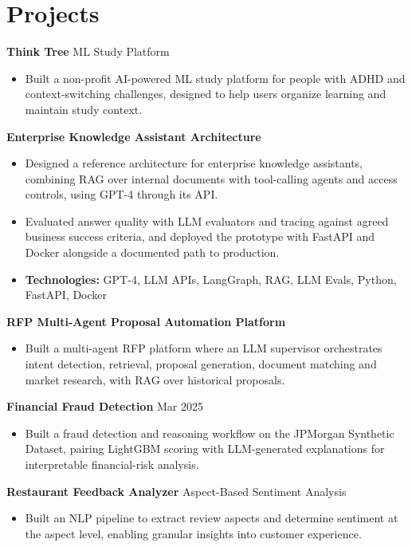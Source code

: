 \documentclass[10pt,a4paper]{article}
\begin{document}
\section{Projects}
\textbf{Think Tree} \textbar{} ML Study Platform\par
\begin{itemize}
  \item Built a non-profit AI-powered ML study platform for people with ADHD and context-switching challenges, designed to help users organize learning and maintain study context.
\end{itemize}
\textbf{Enterprise Knowledge Assistant Architecture}\par
\begin{itemize}
  \item Designed a reference architecture for enterprise knowledge assistants, combining RAG over internal documents with tool-calling agents and access controls, using GPT-4 through its API.
  \item Evaluated answer quality with LLM evaluators and tracing against agreed business success criteria, and deployed the prototype with FastAPI and Docker alongside a documented path to production.
  \item \textbf{Technologies:} GPT-4, LLM APIs, LangGraph, RAG, LLM Evals, Python, FastAPI, Docker
\end{itemize}
\textbf{RFP Multi-Agent Proposal Automation Platform}\par
\begin{itemize}
  \item Built a multi-agent RFP platform where an LLM supervisor orchestrates intent detection, retrieval, proposal generation, document matching and market research, with RAG over historical proposals.
\end{itemize}
\textbf{Financial Fraud Detection} \textbar{} Mar 2025\par
\begin{itemize}
  \item Built a fraud detection and reasoning workflow on the JPMorgan Synthetic Dataset, pairing LightGBM scoring with LLM-generated explanations for interpretable financial-risk analysis.
\end{itemize}
\textbf{Restaurant Feedback Analyzer} \textbar{} Aspect-Based Sentiment Analysis\par
\begin{itemize}
  \item Built an NLP pipeline to extract review aspects and determine sentiment at the aspect level, enabling granular insights into customer experience.
\end{itemize}
\end{document}
